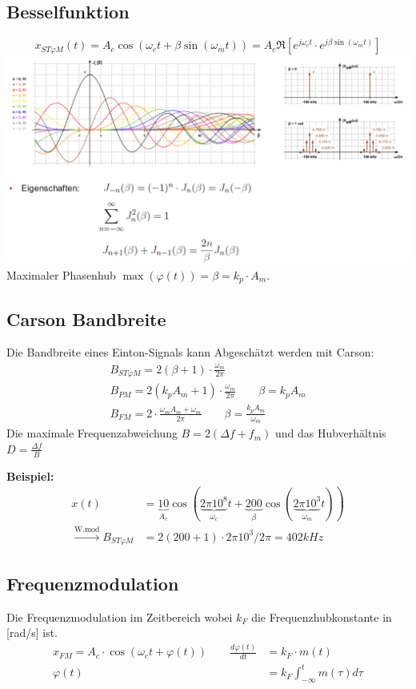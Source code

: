 \subsection{Besselfunktion}
\[
x_{ST\varphi M}(t) = A_c \cos(\omega_ct+\beta\sin(\omega_mt)) = A_c \Re[e^{j\omega_ct} \cdot e^{j\beta\sin(\omega_mt)}]
\]
\includegraphics[width=\columnwidth]{Images/besselfunktion}
Maximaler Phasenhub $\max(\varphi(t)) = \beta = k_p\cdot A_m$. 

\subsection{Carson Bandbreite}
Die Bandbreite eines Einton-Signals kann Abgeschätzt werden mit Carson:
\begin{align*}
	B_{ST\varphi M} = 2(\beta + 1)\cdot\frac{\omega_m}{2\pi} \\
	B_{PM} = 2(k_pA_m+1)\cdot\frac{\omega_m}{2\pi} \qquad \beta = k_p A_m \\
	B_{FM} = 2\cdot\frac{\omega_mA_m+\omega_m}{2\pi} \qquad \beta = \frac{k_p A_m}{\omega_m}
\end{align*}
Die maximale Frequenzabweichung $B = 2(\Delta f + f_m)$ und das Hubverhältnis $D = \frac{\Delta f}{B}$ 

\textbf{Beispiel:}\\
\begin{align*}
	x(t) &= \underbrace{10}_{A_c}\cos(\underbrace{2\pi10^8}_{\omega_c}t+\underbrace{200}_{\beta}\cos(\underbrace{2\pi10^3}_{\omega_m}t)) \\
	\xrightarrow{\text{W.mod}} B_{ST\varphi M} &= 2(200+1)\cdot 2\pi 10^3 / 2 \pi = 402kHz
\end{align*}


\subsection{Frequenzmodulation}
Die Frequenzmodulation im Zeitbereich wobei $k_F$ die Frequenzhubkonstante in [rad/s] ist.
\begin{align*}
	x_{FM} = A_c\cdot\cos(\omega_ct + \varphi(t)) \qquad \frac{d\varphi(t)}{dt} &= k_F\cdot m(t) \\
	\varphi(t) &= k_F\int_{-\infty}^{t}m(\tau)d\tau
\end{align*}